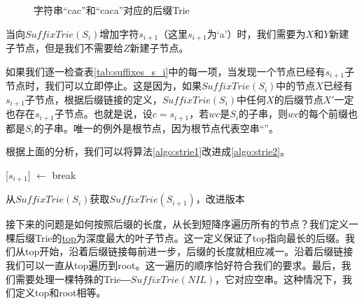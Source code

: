\documentclass{ctexart}
\begin{document}
\begin{figure}[htbp]
  \centering
  \caption{字符串“cac”和“caca”对应的后缀Trie}
  \label{fig:strie-cac}
\end{figure}

当向$SuffixTrie(S_i)$增加字符$s_{i+1}$（这里$s_{i+1}$为‘a’）时，我们需要为$X$和$Y$新建子节点，但是我们不需要给$Z$新建子节点。

如果我们逐一检查表\ref{tab:suffixes_s_i}中的每一项，当发现一个节点已经有$s_{i+1}$子节点时，我们可以立即停止。这是因为，如果$SuffixTrie(S_i)$中的节点$X$已经有$s_{i+1}$子节点，根据后缀链接的定义，$SuffixTrie(S_i)$中任何$X$的后缀节点$X'$一定也存在$s_{i+1}$子节点。也就是说，设$c=s_{i+1}$，若$wc$是$S_i$的子串，则$wc$的每个前缀也都是$S_i$的子串\cite{ukkonen95}。唯一的例外是根节点，因为根节点代表空串“”。

根据上面的分析，我们可以将算法\ref{algo:strie1}改进成\ref{algo:strie2}。

\begin{algorithm}
  \begin{algorithmic}[1]
      \State {}[$s_{i+1}$] $\gets$ 
    \Else
      \State break
    \EndIf
  \EndFor
  \end{algorithmic}
  \caption{从$SuffixTrie(S_i)$获取$SuffixTrie(S_{i+1})$，改进版本}
  \label{algo:strie2}
\end{algorithm}

接下来的问题是如何按照后缀的长度，从长到短降序遍历所有的节点？我们定义一棵后缀Trie的\underline{top}为深度最大的叶子节点。这一定义保证了top指向最长的后缀。我们从top开始，沿着后缀链接每前进一步，后缀的长度就相应减一。沿着后缀链接我们可以一直从top遍历到root。这一遍历的顺序恰好符合我们的要求。最后，我们需要处理一棵特殊的Trie―$SuffixTrie(NIL)$，它对应空串。这种情况下，我们定义top和root相等。
\end{document}
